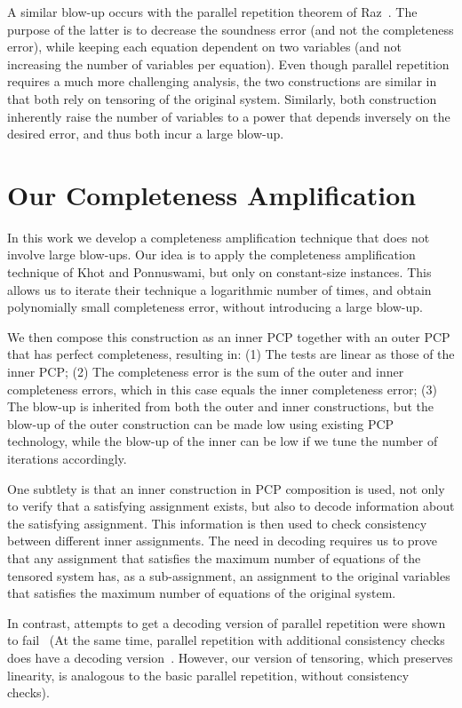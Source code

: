 A similar blow-up occurs with the parallel repetition theorem of Raz~\cite{Raz}. The purpose of the latter is to decrease the soundness error (and not the completeness error), while keeping each equation dependent on two variables (and not increasing the number of variables per equation). Even though parallel repetition requires a much more challenging analysis, the two constructions are similar in that both rely on tensoring of the original system. Similarly, both construction inherently raise the number of variables to a power that depends inversely on the desired error, and thus both incur a large blow-up.

\section{Our Completeness Amplification}

In this work we develop a completeness amplification technique that does not involve large blow-ups. Our idea is to apply the completeness amplification technique of Khot and Ponnuswami, but only on constant-size instances. This allows us to iterate their technique a logarithmic number of times, and obtain polynomially small completeness error, without introducing a large blow-up.

We then compose this construction as an inner PCP together with an outer PCP that has perfect completeness, resulting in: (1) The tests are linear as those of the inner PCP; (2) The completeness error is the sum of the outer and inner completeness errors, which in this case equals the inner completeness error; (3) The blow-up is inherited from both the outer and inner constructions, but the blow-up of the outer construction can be made low using existing PCP technology, while the blow-up of the inner can be low if we tune the number of iterations accordingly.

One subtlety is that an inner construction in PCP composition is used, not only to verify that a satisfying assignment exists, but also to decode information about the satisfying assignment. This information is then used to check consistency between different inner assignments.
The need in decoding requires us to prove that any assignment that satisfies the maximum number of equations of the tensored system has, as a sub-assignment, an assignment to the original variables that satisfies the maximum number of equations of the original system.

In contrast, attempts to get a decoding version of parallel repetition were shown to fail~\cite{DG10} (At the same time, parallel repetition with additional consistency checks does have a decoding version~\cite{IKW}. However, our version of tensoring, which preserves linearity, is analogous to the basic parallel repetition, without consistency checks).
